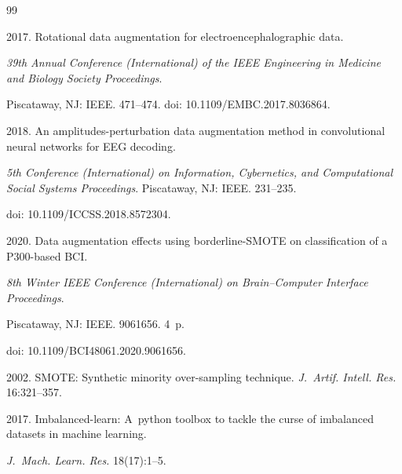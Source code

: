 {{\begin{thebibliography}{99}

 2017. Rotational data augmentation for electroencephalographic data. 

 \textit{39th Annual  Conference (International) of the IEEE Engineering in Medicine and Biology Society Proceedings}. 

 Piscataway, NJ: IEEE. 471--474. doi: 10.1109\!/\!EMBC.2017.8036864.






 2018. An amplitudes-perturbation data augmentation method in convolutional neural networks for EEG decoding. 

\textit{5th  Conference (International) on Information, Cybernetics, and Computational Social Systems Proceedings}. Piscataway, NJ: IEEE. 231--235.

doi: 10.1109\!/\!ICCSS.2018.8572304.





 2020. Data augmentation effects using borderline-SMOTE on classification of a P300-based BCI. 

 \textit{8th  Winter IEEE Conference (International) on Brain--Computer Interface Proceedings}.

 Piscataway, NJ: IEEE. 9061656. 4~p. 

doi:  10.1109\!/\!BCI48061.2020.9061656.





 2002. SMOTE: Synthetic minority over-sampling technique. \textit{J.~Artif. Intell. Res.} 16:321--357.





 2017. Imbalanced-learn: A~python toolbox to tackle the curse of imbalanced datasets in machine learning. 

 \textit{J.~Mach. Learn. Res.} 18(17):1--5.






\end{thebibliography}}}
